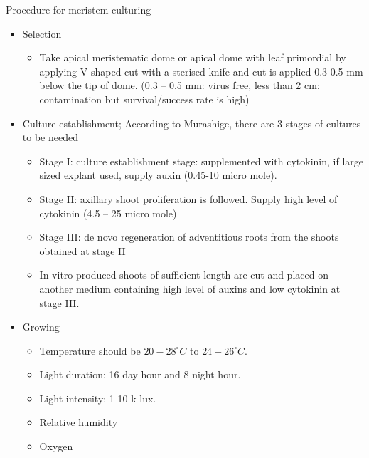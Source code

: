 \documentclass[
  ignorenonframetext,
  aspectratio=169]{beamer}
\providecommand{\tightlist}{%
  \setlength{\itemsep}{0pt}\setlength{\parskip}{0pt}}
\begin{document}
\begin{frame}{Procedure for meristem culturing}
\protect\hypertarget{procedure-for-meristem-culturing}{}
\small

\begin{itemize}
\tightlist
\item
  Selection

  \begin{itemize}
  \tightlist
  \item
    Take apical meristematic dome or apical dome with leaf primordial by
    applying V-shaped cut with a sterised knife and cut is applied
    0.3-0.5 mm below the tip of dome. (0.3 -- 0.5 mm: virus free, less
    than 2 cm: contamination but survival/success rate is high)
  \end{itemize}
\item
  Culture establishment; According to Murashige, there are 3 stages of
  cultures to be needed

  \begin{itemize}
  \tightlist
  \item
    Stage I: culture establishment stage: supplemented with cytokinin,
    if large sized explant used, supply auxin (0.45-10 micro mole).
  \item
    Stage II: axillary shoot proliferation is followed. Supply high
    level of cytokinin (4.5 -- 25 micro mole)
  \item
    Stage III: de novo regeneration of adventitious roots from the
    shoots obtained at stage II
  \item
    In vitro produced shoots of sufficient length are cut and placed on
    another medium containing high level of auxins and low cytokinin at
    stage III.
  \end{itemize}
\end{itemize}
\end{frame}

\begin{frame}{}
\protect\hypertarget{section-9}{}
\begin{itemize}
\tightlist
\item
  Growing

  \begin{itemize}
  \tightlist
  \item
    Temperature should be \(20-28^\circ C\) to \(24-26^\circ C\).
  \item
    Light duration: 16 day hour and 8 night hour.
  \item
    Light intensity: 1-10 k lux.
  \item
    Relative humidity
  \item
    Oxygen
  \end{itemize}
\end{itemize}
\end{frame}
\end{document}
